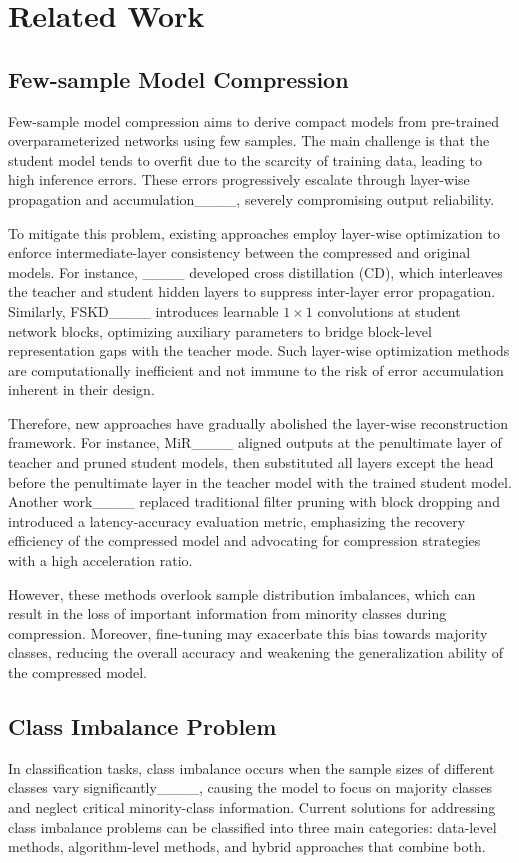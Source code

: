 \section{Related Work}
\subsection{Few-sample Model Compression}
Few-sample model compression aims to derive compact models from pre-trained overparameterized networks using few samples. The main challenge is that the student model tends to overfit due to the scarcity of training data, leading to high inference errors. These errors progressively escalate through layer-wise propagation and accumulation____, severely compromising output reliability.


To mitigate this problem, existing approaches employ layer-wise optimization to enforce intermediate-layer consistency between the compressed and original models. For instance, ____ developed cross distillation (CD), which interleaves the teacher and student hidden layers to suppress inter-layer error propagation. Similarly, FSKD____ introduces learnable 
$1 \times 1$ convolutions at student network blocks, optimizing auxiliary parameters to bridge block-level representation gaps with the teacher mode. Such layer-wise optimization methods are computationally inefficient and not immune to the risk of error accumulation inherent in their design. 

Therefore, new approaches have gradually abolished the layer-wise reconstruction framework. For instance, MiR____ aligned outputs at the penultimate layer of teacher and pruned student models, then substituted all layers except the head before the penultimate layer in the teacher model with the trained student model. Another work____ replaced traditional filter pruning with block dropping and introduced a latency-accuracy evaluation metric, emphasizing the recovery efficiency of the compressed model and advocating for compression strategies with a high acceleration ratio. 

However, these methods overlook sample distribution imbalances, which can result in the loss of important information from minority classes during compression. Moreover, fine-tuning may exacerbate this bias towards majority classes, reducing the overall accuracy and weakening the generalization ability of the compressed model.


\subsection{Class Imbalance Problem}
In classification tasks, class imbalance occurs when the sample sizes of different classes vary significantly____, causing the model to focus on majority classes and neglect critical minority-class information. Current solutions for addressing class imbalance problems can be classified into three main categories: data-level methods, algorithm-level methods, and hybrid approaches that combine both.

